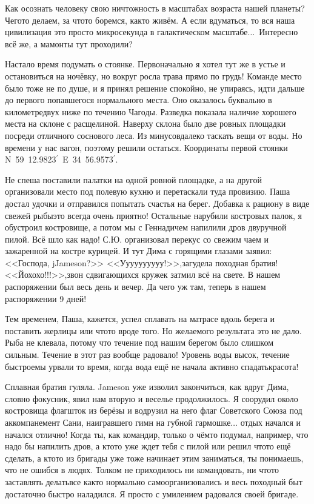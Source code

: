 Как осознать человеку свою ничтожность в масштабах возраста нашей планеты? Чего\sdash то делаем, за что\sdash то боремся, как\sdash то живём. А если вдуматься, то вся наша цивилизация \mdash это просто микросекунда в галактическом масштабе$\ldots$~Интересно всё же, а мамонты тут проходили?

Настало время подумать о стоянке. Первоначально я хотел тут же в устье и остановиться на ночёвку, но вокруг росла трава прямо по грудь! Команде место было тоже не по душе, и я принял решение спокойно, не упираясь, идти дальше до первого попавшегося нормального места. Оно оказалось буквально в километре\sdash двух ниже по течению Чагоды. Разведка показала наличие хорошего места на склоне с расщелиной. Наверху склона было две ровных площадки посреди отличного соснового леса. Из минусов\mdash далеко таскать вещи от воды. Но времени у нас вагон, поэтому решили остаться. Координаты первой стоянки N~59\degree~12.9823$^\prime$~E~34\degree~56.9573$^\prime$. 

Не спеша поставили палатки на одной ровной площадке, а на другой организовали место под полевую кухню и перетаскали туда провизию. Паша достал удочки и отправился попытать счастья на берег. Добавка к рациону в виде свежей рыбы\mdash это всегда очень приятно! Остальные нарубили костровых палок, я обустроил костровище, а потом мы с Геннадичем напилили дров двуручной пилой. Всё шло как надо! С.Ю. организовал перекус со свежим чаем и зажаренной на костре курицей. И тут Дима с горящими глазами заявил: <<Господа, jJameson?>> <<У\sdash у\sdash у\sdash у\sdash у\sdash у\sdash у\sdash у\sdash у\sdash у!>>,\mdash загудела походная братия! <<Йо\sdash хо\sdash хо!!!>>,\mdash звон сдвигающихся кружек затмил всё на свете. В нашем распоряжении был весь день и вечер. Да чего уж там, теперь в нашем распоряжении 9 дней! 

Тем временем, Паша, кажется, успел сплавать на матрасе вдоль берега и поставить жерлицы или что\sdash то вроде того. Но желаемого результата это не дало. Рыба не клевала, потому что течение под нашим берегом было слишком сильным. Течение в этот раз вообще радовало! Уровень воды высок, течение быстрое\mdash мы урвали то время, когда вода ещё не начала активно спадать\mdash кра\sdash со\sdash та!
 
Сплавная братия гуляла. Jameson уже изволил закончиться, как вдруг Дима, словно фокусник, явил нам вторую и веселье продолжилось. Я соорудил около костровища флагшток из берёзы и водрузил на него флаг Советского Союза под аккомпанемент Сани, наигравшего гимн на губной гармошке$\ldots$ отдых начался и начался отлично! Когда ты, как командир, только о чём\sdash то подумал, например, что надо бы напилить дров, а кто\sdash то уже ждет тебя с пилой или решил что\sdash то ещё сделать, а кто\sdash то из бригады уже тоже начинает этим заниматься, ты понимаешь, что не ошибся в людях. Толком не приходилось ни командовать, ни что\sdash то заставлять делать\mdash все как\sdash то нормально самоорганизовались и весь походный быт достаточно быстро наладился. Я просто с умилением радовался своей бригаде.

